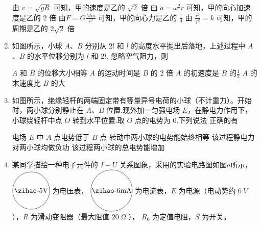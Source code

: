 \begin{enumerate}
\fourchoices
{由 $v=\sqrt{g R}$ 可知，甲的速度是乙的 $\sqrt{2}$ 倍}
{由 $a=\omega^{2} r$ 可知，甲的向心加速度是乙的 2 倍}
{由$ F=G \frac{M m}{r^{2}}$ 可知，甲的向心力是乙的 $\frac{1}{4}$}
{由 $\frac{r^{3}}{T^{2}}=k$ 可知，甲的周期是乙的 $2 \sqrt{2}$ 倍}






\item 
如图所示，小球 $ A $、$ B $ 分别从 $ 2l $ 和 $ l $ 的高度水平抛出后落地，上述过程中 $ A $、$ B $ 的水平位移分别为 $ l $ 和 $ 2l $.
忽略空气阻力，则  
\begin{figure}[h!]
\centering

\end{figure}


\fourchoices
{$ A $ 和 $ B $ 的位移大小相等}
{$ A $ 的运动时间是 $ B $ 的 $ 2 $ 倍}
{$ A $ 的初速度是 $ B $ 的$ \frac{ 1 }{ 2 } $}
{$ A $ 的末速度比 $ B $ 的大}





\item
如图所示，绝缘轻杆的两端固定带有等量异号电荷的小球（不计重力）。开始时，两小球分别静止在 $ A $、$ B $
位置.现外加一匀强电场 $ E $，在静电力作用下，小球绕轻杆中点 $ O $ 转到水平位置.取 $ O $ 点的电势为 $ 0 $.下列说法
正确的有  
\begin{figure}[h!]
\centering

\end{figure}


\fourchoices
{电场 $ E $ 中 $ A $ 点电势低于 $ B $ 点}
{转动中两小球的电势能始终相等}
{该过程静电力对两小球均做负功}
{该过程两小球的总电势能增加}







\gaokaosy

\item
某同学描绘一种电子元件的 $ I-U $ 关系图象，采用的实验电路图如图$ a $所示，$ \voltmetermytikz $ 为电压表，  
$ \mammetermytikz $    为电流表，$ E $ 为电源（电动势约 $ 6 \ V $ ），$ R $ 为滑动变阻器（最大阻值 $ 20 \ \Omega $ ）， $ R_{0} $ 为定值电阻，$ S $ 为开关。


\end{enumerate}
